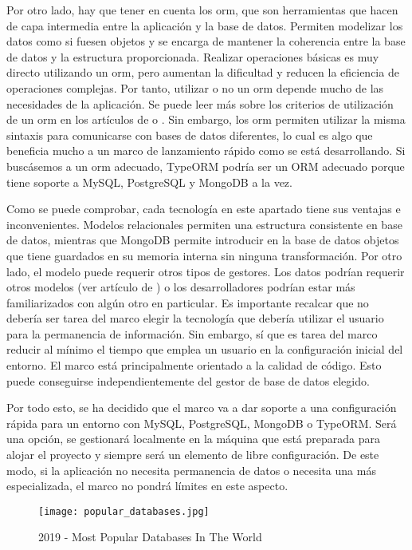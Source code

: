Por otro lado, hay que tener en cuenta los \gls{orm}, que son herramientas que hacen de capa intermedia entre la aplicación y la base de datos. Permiten modelizar los datos como si fuesen objetos y se encarga de mantener la coherencia entre la base de datos y la estructura proporcionada. Realizar operaciones básicas es muy directo utilizando un \gls{orm}, pero aumentan la dificultad y reducen la eficiencia de operaciones complejas. Por tanto, utilizar o no un \gls{orm} depende mucho de las necesidades de la aplicación. Se puede leer más sobre los criterios de utilización de un \gls{orm} en los artículos de \citet{ORMYON1} o \citet{ORMYON2}. Sin embargo, los \gls{orm} permiten utilizar la misma sintaxis para comunicarse con bases de datos diferentes, lo cual es algo que beneficia mucho a un marco de lanzamiento rápido como se está desarrollando. Si buscásemos a un \gls{orm} adecuado, TypeORM podría ser un ORM adecuado porque tiene soporte a MySQL, PostgreSQL y MongoDB a la vez.

Como se puede comprobar, cada tecnología en este apartado tiene sus ventajas e inconvenientes. Modelos relacionales permiten una estructura consistente en base de datos, mientras que MongoDB permite introducir en la base de datos objetos que tiene guardados en su memoria interna sin ninguna transformación. Por otro lado, el modelo puede requerir otros tipos de gestores. Los datos podrían requerir otros modelos (ver artículo de \citet{DBMSTYP}) o los desarrolladores podrían estar más familiarizados con algún otro en particular. Es importante recalcar que no debería ser tarea del marco elegir la tecnología que debería utilizar el usuario para la permanencia de información. Sin embargo, sí que es tarea del marco reducir al mínimo el tiempo que emplea un usuario en la configuración inicial del entorno. El marco está principalmente orientado a la calidad de código. Esto puede conseguirse independientemente del gestor de base de datos elegido.

Por todo esto, se ha decidido que el marco va a dar soporte a una configuración rápida para un entorno con MySQL, PostgreSQL, MongoDB o TypeORM. Será una opción, se gestionará localmente en la máquina que está preparada para alojar el proyecto y siempre será un elemento de libre configuración. De este modo, si la aplicación no necesita permanencia de datos o necesita una más especializada, el marco no pondrá límites en este aspecto.

\begin{figure}
	\centering
	\texttt{[image: popular\_databases.jpg]}
	\caption{2019 - Most Popular Databases In The World}
	\label{fig:dbms}
\end{figure}
